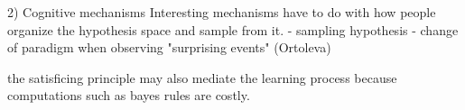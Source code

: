 2) Cognitive mechanisms 
Interesting mechanisms have to do with how people organize the hypothesis space and sample from it. 
- sampling hypothesis
- change of paradigm when observing "surprising events" (Ortoleva)

the satisficing principle may also mediate the learning process because computations such as bayes rules are costly.